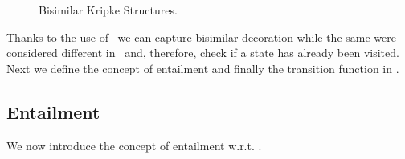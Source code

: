 	\begin{figure}
		\centering
		\hfill
		\caption{Bisimilar Kripke Structures.}
		\label{fig:equality}
	\end{figure}
        Thanks to the use
        of \posS\ we can capture bisimilar decoration while the same were considered different in \mAL\ and, therefore, check if a state has already been visited. 
	Next we define the concept of entailment and finally the transition function in \ourL.
%
%
%
\FloatBarrier
\subsection{Entailment} \label{subsec-contribution:entail}
	
	
	We now %
	introduce the
	concept of entailment w.r.t. \posS.
	
